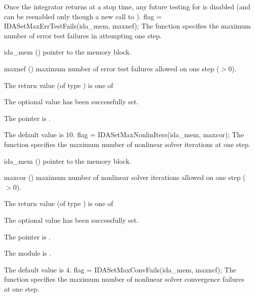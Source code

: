 {{  Once the integrator returns at a stop time, any future testing for 
  is disabled (and can be reenabled only though a new call to ).
}
{
flag = IDASetMaxErrTestFails(ida\_mem, maxnef);
}
{
  The function  specifies the
  maximum number of error test failures in attempting one step.
}
{
  \begin{args}
  \item[ida\_mem] ()
    pointer to the {\idas} memory block.
  \item[maxnef] ()
    maximum number of error test failures allowed on one step ($>0$).
  \end{args}
}
{
  The return value  (of type ) is one of
  \begin{args}
  \item[\Id{IDA\_SUCCESS}]
    The optional value has been successfully set.
  \item[\Id{IDA\_MEM\_NULL}]
    The  pointer is .
  \end{args}
}
{
  The default value is $10$.
}
{
flag = IDASetMaxNonlinIters(ida\_mem, maxcor);
}
{
  The function  specifies the maximum
  number of nonlinear solver iterations at one step.
}
{
  \begin{args}
  \item[ida\_mem] ()
    pointer to the {\idas} memory block.
  \item[maxcor] ()
    maximum number of nonlinear solver iterations allowed on one step ($>0$).
  \end{args}
}
{
  The return value  (of type ) is one of
  \begin{args}
  \item[\Id{IDA\_SUCCESS}]
    The optional value has been successfully set.
  \item[\Id{IDA\_MEM\_NULL}]
    The  pointer is .
  \item[\Id{IDA\_MEM\_FAIL}]
    The {\sunnonlinsol} module is .
  \end{args}
}
{
  The default value is $4$.
}
{
flag = IDASetMaxConvFails(ida\_mem, maxncf);
}
{
  The function  specifies the
  maximum number of nonlinear solver convergence failures at one step.
}
{
  \begin{args}

\end{args}}}
